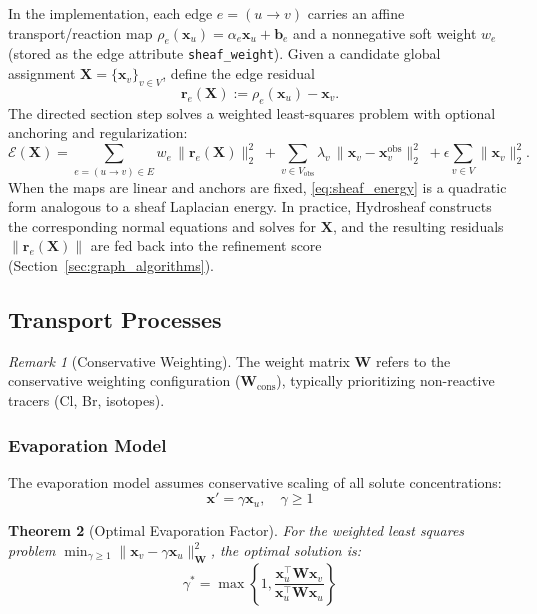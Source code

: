 \documentclass[12pt,a4paper]{article}
\theoremstyle{plain}
\newtheorem{theorem}{Theorem}[section]
\theoremstyle{definition}
\theoremstyle{remark}
\newtheorem{remark}[theorem]{Remark}
\begin{document}
In the implementation, each edge $e=(u\to v)$ carries an affine transport/reaction map $\rho_e(\mathbf{x}_u)=\alpha_e\mathbf{x}_u+\mathbf{b}_e$ and a nonnegative soft weight $w_e$ (stored as the edge attribute \texttt{sheaf\_weight}). Given a candidate global assignment $\mathbf{X}=\{\mathbf{x}_v\}_{v\in V}$, define the edge residual
\[\mathbf{r}_e(\mathbf{X}) := \rho_e(\mathbf{x}_u) - \mathbf{x}_v.\]
The directed section step solves a weighted least-squares problem with optional anchoring and regularization:
\begin{equation}\label{eq:sheaf_energy}
\mathcal{E}(\mathbf{X})
= \sum_{e=(u\to v)\in E} w_e\, \|\mathbf{r}_e(\mathbf{X})\|_2^2
\; + \sum_{v\in V_{\mathrm{obs}}} \lambda_v\, \|\mathbf{x}_v-\mathbf{x}_v^{\mathrm{obs}}\|_2^2
\; + \epsilon\sum_{v\in V}\|\mathbf{x}_v\|_2^2.
\end{equation}
When the maps are linear and anchors are fixed, \eqref{eq:sheaf_energy} is a quadratic form analogous to a sheaf Laplacian energy. In practice, Hydrosheaf constructs the corresponding normal equations and solves for $\mathbf{X}$, and the resulting residuals $\|\mathbf{r}_e(\mathbf{X})\|$ are fed back into the refinement score (Section~\ref{sec:graph_algorithms}).

\subsection{Transport Processes}\label{sec:transport_processes}

\begin{remark}[Conservative Weighting]
	The weight matrix $\mathbf{W}$ refers to the conservative weighting configuration ($\mathbf{W}_{\text{cons}}$), typically prioritizing non-reactive tracers (Cl, Br, isotopes).
\end{remark}

\subsubsection{Evaporation Model}
The evaporation model assumes conservative scaling of all solute concentrations:
\begin{equation}\label{eq:evaporation}
	\mathbf{x}' = \gamma \mathbf{x}_u, \quad \gamma \geq 1
\end{equation}
\begin{theorem}[Optimal Evaporation Factor]\label{thm:evap_optimal}
	For the weighted least squares problem $\min_{\gamma \geq 1} \|\mathbf{x}_v - \gamma \mathbf{x}_u\|_{\mathbf{W}}^2$, the optimal solution is:
	\begin{equation}\label{eq:gamma_optimal}
		\gamma^* = \max\left\{1, \frac{\mathbf{x}_u^\top \mathbf{W} \mathbf{x}_v}{\mathbf{x}_u^\top \mathbf{W} \mathbf{x}_u}\right\}
	\end{equation}
\end{theorem}
\end{document}
